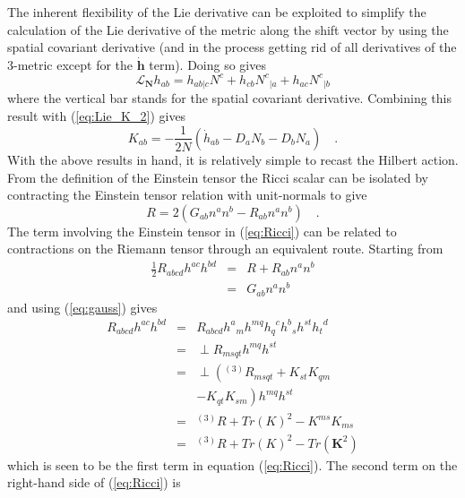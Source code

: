 \documentclass[twocolumn]{article}
\def\.{{\quad .}}
\begin{document}
The inherent flexibility of the Lie derivative can be exploited to simplify the
calculation of the Lie derivative of the metric along the shift vector by
using the spatial covariant derivative (and in the process getting rid of all
derivatives of the 3-metric except for the $\mathbf{\dot h}$ term).
Doing so gives
\[
   {\mathcal L}_{\mathbf{N}} h_{ab} = h_{ab|c} N^c + h_{cb} {N^{c}}_{|a}
                                                  + h_{ac} {N^{c}}_{|b}
\]
where the vertical bar stands for the spatial covariant derivative.  Combining
this result with (\ref{eq:Lie_K_2}) gives
\[
   K_{ab} = -\frac{1}{2 N} \left( {\dot h}_{ab} - D_{a} N_{b} - D_{b} N_{a} \right) \.
\]
With the above results in hand, it is relatively simple to recast the Hilbert
action.  From the definition of the Einstein tensor the Ricci scalar can be
isolated by contracting the Einstein tensor relation with unit-normals to give
\begin{equation}\label{eq:Ricci}
   R = 2 \left( G_{ab}n^an^b - R_{ab} n^a n^b \right) \.
\end{equation}
The term involving the Einstein tensor in (\ref{eq:Ricci}) can be related to
contractions on the Riemann tensor through an equivalent route.  Starting from
\begin{eqnarray*}
   \frac{1}{2} R_{abcd} h^{ac} h^{bd} & = & R + R_{ab} n^a n^b \nonumber \\
                                      & = & G_{ab} n^a n^b
\end{eqnarray*}
and using (\ref{eq:gauss}) gives
\begin{eqnarray*}
   R_{abcd} h^{ac} h^{bd} & = & R_{abcd}{h^a}_m h^{mq} {h_q}^c {h^b}_s h^{st} {h_t}^d \nonumber \\
                          & = & \perp R_{msqt} h^{mq} h^{st} \nonumber \\
                          & = & \perp \left( {}^{(3)}R_{msqt} + K_{st}K_{qm} \right. \nonumber \\
                          &   & \left. - K_{qt}K_{sm} \right) h^{mq} h^{st} \nonumber \\
                          & = & {}^{(3)}R + {Tr(K)}^2 - K^{ms}K_{ms} \nonumber \\
                          & = & {}^{(3)}R + {Tr(K)}^2 - Tr({\mathbf K}^2)
\end{eqnarray*}
which is seen to be the first term in equation (\ref{eq:Ricci}).
The second term on the right-hand side of
(\ref{eq:Ricci}) is
\end{document}
